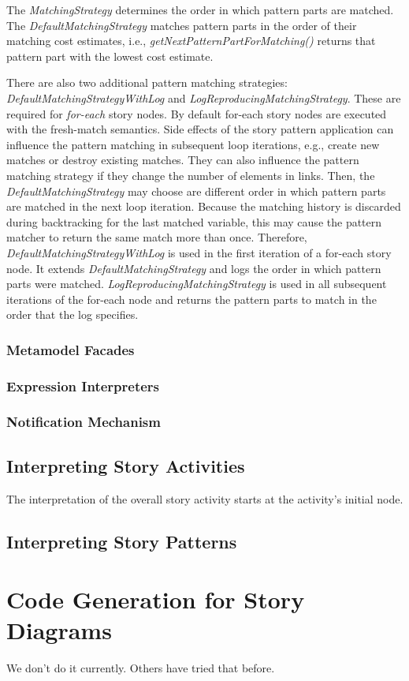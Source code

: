 The \emph{MatchingStrategy} determines the order in which pattern parts are matched. The \emph{DefaultMatchingStrategy} matches pattern parts in the order of their matching cost estimates, i.e., \emph{getNextPatternPartForMatching()} returns that pattern part with the lowest cost estimate. 

There are also two additional pattern matching strategies: \emph{DefaultMatchingStrategyWithLog} and \emph{LogReproducingMatchingStrategy}. These are required for \emph{for-each} story nodes. By default for-each story nodes are executed with the fresh-match semantics. Side effects of the story pattern application can influence the pattern matching in subsequent loop iterations, e.g., create new matches or destroy existing matches. They can also influence the pattern matching strategy if they change the number of elements in links. Then, the \emph{DefaultMatchingStrategy} may choose are different order in which pattern parts are matched in the next loop iteration. Because the matching history is discarded during backtracking for the last matched variable, this may cause the pattern matcher to return the same match more than once. Therefore, \emph{DefaultMatchingStrategyWithLog} is used in the first iteration of a for-each story node. It extends \emph{DefaultMatchingStrategy} and logs the order in which pattern parts were matched. \emph{LogReproducingMatchingStrategy} is used in all subsequent iterations of the for-each node and returns the pattern parts to match in the order that the log specifies.

\subsubsection{Metamodel Facades}
\label{sec:metamodel_facades}

\subsubsection{Expression Interpreters}
\label{sec:expression_interpreters}

\subsubsection{Notification Mechanism}
\label{sec:notification_mechanism}

\subsection{Interpreting Story Activities}

The interpretation of the overall story activity starts at the activity's initial node. 




\subsection{Interpreting Story Patterns}


\section{Code Generation for Story Diagrams}
 We don't do it currently. Others have tried that before.\cite{GBD07}